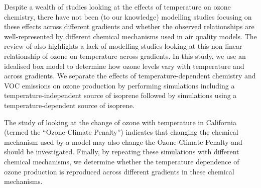 Despite a wealth of studies looking at the effects of temperature on ozone chemistry, there have not been (to our knowledge) modelling studies focusing on these effects across different  gradients and whether the observed relationships are well-represented by different chemical mechanisms used in air quality models.
The review of \citet{Pusede:2015} also highlights a lack of modelling studies looking at this non-linear relationship of ozone on temperature across  gradients.
In this study, we use an idealised box model to determine how ozone levels vary with temperature and across  gradients.
We separate the effects of temperature-dependent chemistry and VOC emissions on ozone production by performing simulations including a temperature-independent source of isoprene followed by simulations using a temperature-dependent source of isoprene. 

The study of \citet{Rasmussen:2013} looking at the change of ozone with temperature in California (termed the ``Ozone-Climate Penalty'') indicates that changing the chemical mechanism used by a model may also change the Ozone-Climate Penalty and should be investigated.
Finally, by repeating these simulations with different chemical mechanisms, we determine whether the temperature dependence of ozone production is reproduced across different  gradients in these chemical mechanisms.

